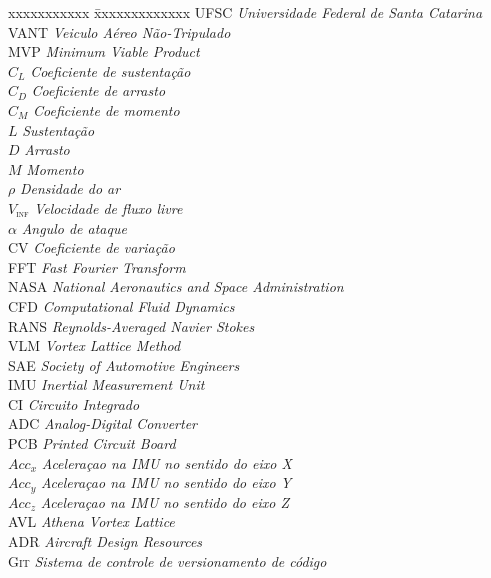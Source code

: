 \ifx\isenglish\undefined
{}
\else
{}
\fi


\begin{tabbing}
xxxxxxxxxxx \= xxxxxxxxxxxxx \kill
\textsc{UFSC} \> \textit{Universidade Federal de Santa Catarina}\\
\textsc{VANT} \> \textit{Veiculo Aéreo Não-Tripulado}\\
\textsc{MVP} \> \textit{Minimum Viable Product}\\
\textsc{$C_L$} \> \textit{Coeficiente de sustentação}\\
\textsc{$C_D$} \> \textit{Coeficiente de arrasto}\\
\textsc{$C_M$} \> \textit{Coeficiente de momento}\\
\textsc{$L$} \> \textit{Sustentação}\\
\textsc{$D$} \> \textit{Arrasto}\\
\textsc{$M$} \> \textit{Momento}\\
\textsc{$\rho$} \> \textit{Densidade do ar}\\
\textsc{$V_{\inf}$} \> \textit{Velocidade de fluxo livre}\\
\textsc{$\alpha$} \> \textit{Angulo de ataque}\\
\textsc{CV} \> \textit{Coeficiente de variação}\\
\textsc{FFT} \> \textit{Fast Fourier Transform}\\
\textsc{NASA} \> \textit{National Aeronautics and Space Administration}\\
\textsc{CFD} \> \textit{Computational Fluid Dynamics}\\
\textsc{RANS} \> \textit{Reynolds-Averaged Navier Stokes}\\
\textsc{VLM} \> \textit{Vortex Lattice Method}\\
\textsc{SAE} \> \textit{Society of Automotive Engineers}\\
\textsc{IMU} \> \textit{Inertial Measurement Unit}\\
\textsc{CI} \> \textit{Circuito Integrado}\\
\textsc{ADC} \> \textit{Analog-Digital Converter}\\
\textsc{PCB} \> \textit{Printed Circuit Board}\\
\textsc{$Acc_x$} \> \textit{Aceleraçao na IMU no sentido do eixo X}\\
\textsc{$Acc_y$} \> \textit{Aceleraçao na IMU no sentido do eixo Y}\\
\textsc{$Acc_z$} \> \textit{Aceleraçao na IMU no sentido do eixo Z}\\
\textsc{AVL} \> \textit{Athena Vortex Lattice}\\
\textsc{ADR} \> \textit{Aircraft Design Resources}\\
\textsc{Git} \> \textit{Sistema de controle de versionamento de código}\\
\end{tabbing}


